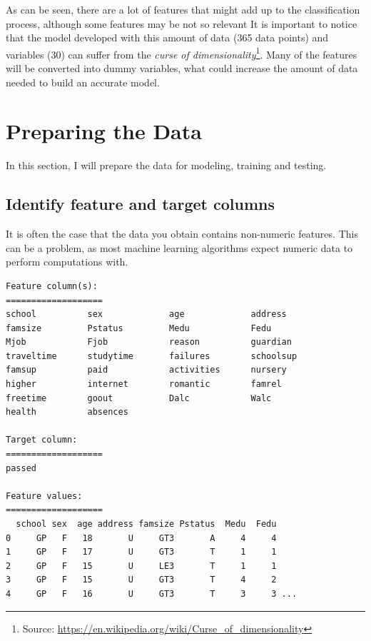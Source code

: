 \documentclass[a4paper]{article}
\begin{document}
As can be seen, there are a lot of features that might add up to the classification process, although some features may be not so relevant It is important to notice that the model developed with this amount of data (365 data points) and variables (30) can suffer from the  \textit{curse of dimensionality}\footnote{Source: \url{https://en.wikipedia.org/wiki/Curse_of_dimensionality}}. Many of the features will be converted into dummy variables, what could increase the amount of data needed to build an accurate model.


\section{Preparing the Data}
In this section, I will prepare the data for modeling, training and testing.
\subsection{Identify feature and target columns}
It is often the case that the data you obtain contains non-numeric features. This can be a problem, as most machine learning algorithms expect numeric data to perform computations with.

\begin{lstlisting}
Feature column(s):
===================
school         	sex            	age            	address        
famsize        	Pstatus        	Medu           	Fedu           
Mjob           	Fjob           	reason         	guardian       
traveltime     	studytime      	failures       	schoolsup      
famsup         	paid           	activities     	nursery        
higher         	internet       	romantic       	famrel         
freetime       	goout          	Dalc           	Walc           
health         	absences       

Target column:
===================
passed

Feature values:
===================
  school sex  age address famsize Pstatus  Medu  Fedu
0     GP   F   18       U     GT3       A     4     4
1     GP   F   17       U     GT3       T     1     1
2     GP   F   15       U     LE3       T     1     1
3     GP   F   15       U     GT3       T     4     2
4     GP   F   16       U     GT3       T     3     3 ...
\end{lstlisting}
\end{document}
